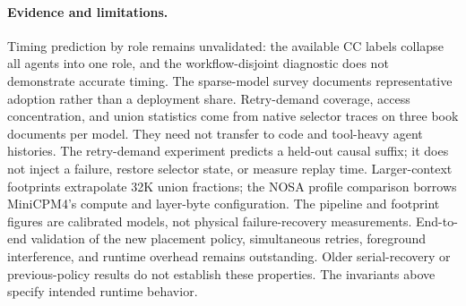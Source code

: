 \paragraph{Evidence and limitations.}
Timing prediction by role remains unvalidated: the available CC
labels collapse all agents into one role, and the workflow-disjoint
diagnostic does not demonstrate accurate timing. The sparse-model survey
documents representative adoption rather than a deployment share.
Retry-demand coverage, access concentration, and union statistics come from native selector
traces on three book documents per model. They need not transfer to
code and tool-heavy agent histories. The retry-demand experiment predicts
a held-out causal suffix; it does not inject a failure, restore selector
state, or measure replay time. Larger-context footprints extrapolate
32K union fractions; the NOSA profile comparison borrows MiniCPM4's
compute and layer-byte configuration. The pipeline and footprint figures
are calibrated models, not physical failure-recovery measurements.
End-to-end validation of the new placement policy, simultaneous retries,
foreground interference, and runtime overhead remains outstanding.
Older serial-recovery or previous-policy results do not establish these
properties. The invariants above specify intended runtime behavior.
